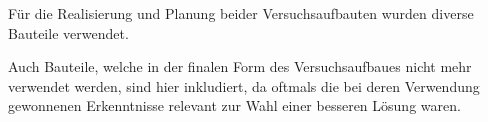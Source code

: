 Für die Realisierung und Planung beider Versuchsaufbauten wurden diverse Bauteile verwendet.

Auch Bauteile, welche in der finalen Form des Versuchsaufbaues nicht mehr verwendet werden, sind hier inkludiert, da oftmals die bei deren Verwendung gewonnenen Erkenntnisse relevant zur Wahl einer besseren Lösung waren.

